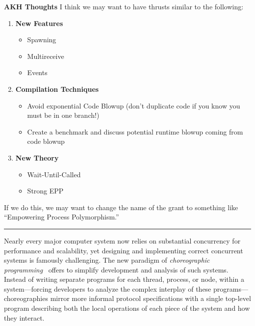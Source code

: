 \noindent\textbf{AKH Thoughts}
I think we may want to have thrusts similar to the following:
\begin{enumerate}
\item \textbf{New Features}
  \begin{itemize}
  \item Spawning
  \item Multireceive 
  \item Events
  \end{itemize}
\item \textbf{Compilation Techniques}
  \begin{itemize}
  \item Avoid exponential Code Blowup (don't duplicate code if you know you must be in one branch!)
  \item Create a benchmark and discuss potential runtime blowup coming from code blowup
  \end{itemize}
\item \textbf{New Theory}
  \begin{itemize}
  \item Wait-Until-Called
  \item Strong EPP 
  \end{itemize}
\end{enumerate}

If we do this, we may want to change the name of the grant to something like ``Empowering Process Polymorphism.''

\vspace{0.5em}
\hrule
\vspace{0.5em}

Nearly every major computer system now relies on substantial concurrency for performance and scalability,
yet designing and implementing correct concurrent systems is famously challenging.
The new paradigm of \emph{choreographic programming}~\citep{Montesi13,Montesi23} offers to simplify development and analysis of such systems.
Instead of writing separate programs for each thread, process, or node, within a system---forcing developers to analyze the complex interplay of these programs---%
choreographies mirror more informal protocol specifications with a single top-level program
describing both the local operations of each piece of the system and how they interact.

